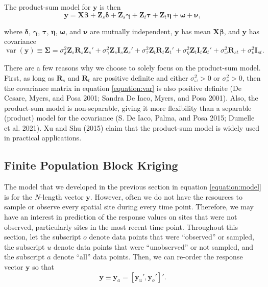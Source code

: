 \documentclass[smallextended]{svjour3}       %
\begin{document}
The product-sum model for \(\mathbf{y}\) is then \mbox{}
\begin{equation} \label{equation:model}
\mathbf{y} = \mathbf{X} \bm{\beta} + \mathbf{Z}_{s} \bm{\delta} + \mathbf{Z}_{s} \bm{\gamma} + \mathbf{Z}_t \bm{\tau} + \mathbf{Z}_t \bm{\eta} + \bm{\omega} + \bm{\nu},
\end{equation}

\noindent where \(\bm{\delta}\), \(\bm{\gamma}\), \(\bm{\tau}\),
\(\bm{\eta}\), \(\bm{\omega}\), and \(\bm{\nu}\) are mutually
independent, \(\mathbf{y}\) has mean \(\mathbf{X} \bm{\beta}\), and
\(\mathbf{y}\) has covariance \mbox{} \begin{equation}
\label{equation:var}
\mathop{\mathrm{{var}}}(\mathbf{y}) \equiv \bm{\Sigma} = \sigma^2_{\delta} \mathbf{Z}_{s} \mathbf{R}_{s} \mathbf{Z}_{s}' + \sigma^2_{\gamma} \mathbf{Z}_{s} \mathbf{I}_{s} \mathbf{Z}_{s}' + \sigma^2_{\tau} \mathbf{Z}_t \mathbf{R}_t \mathbf{Z}_t'+ \sigma^2_{\eta} \mathbf{Z}_t \mathbf{I}_t \mathbf{Z}_t' + \sigma^2_{\omega} \mathbf{R}_{st} + \sigma^2_{\nu} \mathbf{I}_{st}.
\end{equation}

\noindent There are a few reasons why we choose to solely focus on the
product-sum model. First, as long as \(\mathbf{R}_s\) and
\(\mathbf{R}_t\) are positive definite and either
\(\sigma^2_{\omega} > 0\) or \(\sigma^2_{\nu} > 0\), then the covariance
matrix in equation \ref{equation:var} is also positive definite (De
Cesare, Myers, and Posa 2001; Sandra De Iaco, Myers, and Posa 2001).
Also, the product-sum model is non-separable, giving it more flexibility
than a separable (product) model for the covariance (S. De Iaco, Palma,
and Posa 2015; Dumelle et al. 2021). Xu and Shu (2015) claim that the
product-sum model is widely used in practical applications.

\hypertarget{subsection:fpbk}{%
\subsection{Finite Population Block Kriging}\label{subsection:fpbk}}

The model that we developed in the previous section in equation
\ref{equation:model} is for the \(N\)-length vector \(\mathbf{y}\).
However, often we do not have the resources to sample or observe every
spatial site during every time point. Therefore, we may have an interest
in prediction of the response values on sites that were not observed,
particularly sites in the most recent time point. Throughout this
section, let the subscript \(o\) denote data points that were
``observed'' or sampled, the subscript \(u\) denote data points that
were ``unobserved'' or not sampled, and the subscript \(a\) denote
``all'' data points. Then, we can re-order the response vector
\(\mathbf{y}\) so that \mbox{} \begin{equation} \label{equation:ordered}
\mathbf{y} \equiv \mathbf{y}_a = [\mathbf{y}_u', \mathbf{y}_o']'.
\end{equation}
\end{document}
